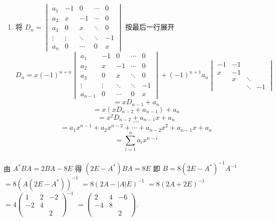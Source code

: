 \begin{enumerate}
			\item %
			      将 $D_n = \begin{vmatrix}
					      a_1    & -1     & 0      & \cdots & 0  \\
					      a_2    & x      & -1     & \cdots & 0  \\
					      a_3    & 0      & x      & \ddots & 0  \\
					      \vdots & \vdots & \ddots & \ddots & -1 \\
					      a_n    & 0      & \cdots & 0      & x
				      \end{vmatrix}$ 按最后一行展开
			      \[D_n = x(-1)^{n+n} \begin{vmatrix}
					      a_1     & -1     & 0      & \cdots & 0  \\
					      a_2     & x      & -1     & \cdots & 0  \\
					      a_3     & 0      & x      & \ddots & 0  \\
					      \vdots  & \vdots & \ddots & \ddots & -1 \\
					      a_{n-1} & 0      & \cdots & 0      & x
				      \end{vmatrix} + (-1)^{n+1}a_n \begin{vmatrix}
					      -1 & -1 &        &    \\
					      x  & -1 &        &    \\
					         & x  & \ddots &    \\
					         &    & \ddots & -1
				      \end{vmatrix}\]
			      \[= xD_{n-1} + a_n\]
			      \[= x(xD_{n-2} + a_{n-1}) + a_n\]
			      \[= x^2D_{n-2} + a_{n-1}x + a_n\]
			      \[\cdots\]
			      \[= a_1x^{n-1} + a_2x^{n-2} + \cdots + a_{n-2}x^2 + a_{n-1}x + a_n\]
			      \[= \sum_{i=1}^{n} a_i x^{n-i}\]
		\end{enumerate}


	\paragraph{} %
		由 $A^*BA = 2BA - 8E$
		得 $(2E - A^*)BA = 8E$
		即 $B = 8(2E - A^*)^{-1}A^{-1}$
		$= 8(A(2E - A^*))^{-1}$
		$= 8(2A - |A|E)^{-1}$
		$= 8(2A + 2E)^{-1}$
		$= 4\begin{pmatrix}
				1  & 2 & -2 \\
				-2 & 4 &    \\
				   &   & 2
			\end{pmatrix}^{-1}$
		$= \begin{pmatrix}
				2  & 4 & -6 \\
				-4 & 8 &    \\
				   &   & 2
			\end{pmatrix}$.


